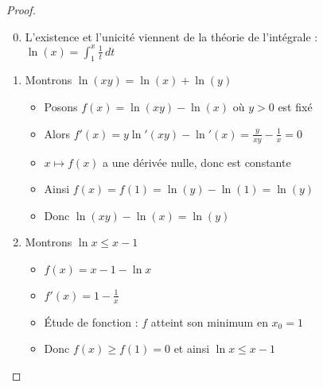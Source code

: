 \begin{frame}
\begin{proof}  
\begin{enumerate}
\setcounter{enumi}{-1}
  \item 

L'existence et l'unicité viennent de la théorie de l'intégrale :  
  $\ln(x) = \int_1^x \frac1t \, dt$
  
\pause


  \item Montrons $\ln(xy)=\ln(x)+\ln(y)$
  \begin{itemize}
  
\pause  
  
    \item Posons $f(x)=\ln(xy)-\ln(x)$ où $y>0$ est fixé
  
\pause    
    
    \item Alors $f'(x)=y\ln'(xy)-\ln'(x)=\frac{y}{xy}-\frac1x = 0$
   
\pause   
    \item $x \mapsto f(x)$ a une dérivée nulle, 
  donc est constante 
  
\pause  
  
    \item Ainsi $f(x)=f(1) =\ln(y)-\ln(1)=\ln(y)$
  
\pause    
    
    \item Donc $\ln(xy)-\ln(x)=\ln(y)$
  \end{itemize}
\pause  
  
\setcounter{enumi}{5}  

 
  \item Montrons $\ln x \le x-1$
  
\pause  
    \begin{itemize}
      \item $f(x) =  x-1 - \ln x$
  
\pause      
      \item $f'(x)= 1 -\frac1x$
  
\pause      
      \item \'Etude de fonction : $f$ atteint son minimum en $x_0=1$
   
\pause     
      \item Donc $f(x) \ge f(1)=0$ et ainsi $\ln x \le x-1$
    \end{itemize}
\qedhere
  
\end{enumerate}

  
\end{proof}  
\end{frame}



